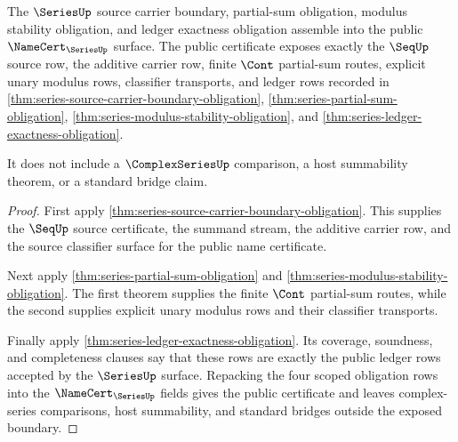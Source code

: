 \begin{theorem}
\label{thm:series-public-namecert-certificate}
The $\SeriesUp$ source carrier boundary, partial-sum obligation, modulus
stability obligation, and ledger exactness obligation assemble into the public
$\NameCert_{\SeriesUp}$ surface. The public certificate exposes exactly the
$\SeqUp$ source row, the additive carrier row, finite $\Cont$ partial-sum
routes, explicit unary modulus rows, classifier transports, and ledger rows
recorded in
\autoref{thm:series-source-carrier-boundary-obligation},
\autoref{thm:series-partial-sum-obligation},
\autoref{thm:series-modulus-stability-obligation}, and
\autoref{thm:series-ledger-exactness-obligation}.

It does not include a $\ComplexSeriesUp$ comparison, a host summability theorem,
or a standard bridge claim.
\end{theorem}
\begin{proof}
First apply
\autoref{thm:series-source-carrier-boundary-obligation}. This supplies the
$\SeqUp$ source certificate, the summand stream, the additive carrier row, and
the source classifier surface for the public name certificate.

Next apply \autoref{thm:series-partial-sum-obligation} and
\autoref{thm:series-modulus-stability-obligation}. The first theorem supplies
the finite $\Cont$ partial-sum routes, while the second supplies explicit unary
modulus rows and their classifier transports.

Finally apply \autoref{thm:series-ledger-exactness-obligation}. Its coverage,
soundness, and completeness clauses say that these rows are exactly the public
ledger rows accepted by the $\SeriesUp$ surface. Repacking the four scoped
obligation rows into the $\NameCert_{\SeriesUp}$ fields gives the public
certificate and leaves complex-series comparisons, host summability, and
standard bridges outside the exposed boundary.
\end{proof}


